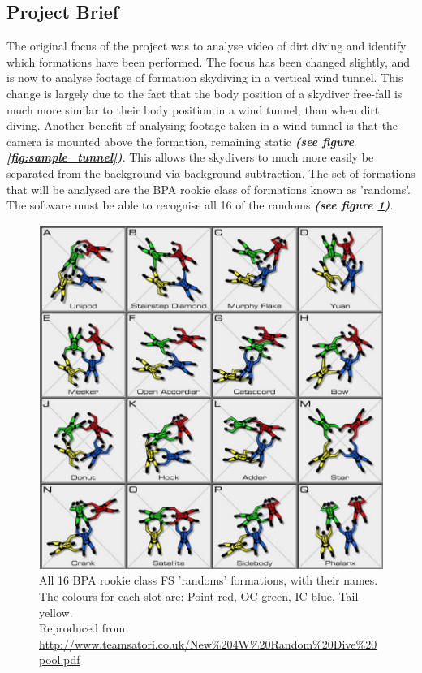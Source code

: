 \documentclass[a4paper, 12pt]{article}
\begin{document}
	\subsection{Project Brief}
The original focus of the project was to analyse video of dirt diving and identify which formations have been performed. The focus has been changed slightly, and is now to analyse footage of formation skydiving in a vertical wind tunnel. This change is largely due to the fact that the body position of a skydiver free-fall is much more similar to their body position in a wind tunnel, than when dirt diving. Another benefit of analysing footage taken in a wind tunnel is that the camera is mounted above the formation, remaining static \textbf{\emph{(see figure \ref{fig:sample_tunnel})}}. This allows the skydivers to much more easily be separated from the background via background subtraction\cite{Piccardi}. The set of formations that will be analysed are the BPA rookie class of formations known as 'randoms'. The software must be able to recognise all 16 of the randoms \textbf{\emph{(see figure \ref{fig:fs_dive_pool})}}.
%
\begin{figure}[H]
	\centering
	\includegraphics[width=\linewidth]{FS_All.png}
	\caption{All 16 BPA rookie class FS 'randoms' formations, with their names. The colours for each slot are: Point red, OC green, IC blue, Tail yellow.\\
	Reproduced from \url{http://www.teamsatori.co.uk/New\%204W\%20Random\%20Dive\%20pool.pdf}}
	\label{fig:fs_dive_pool}
\end{figure}
\end{document}
